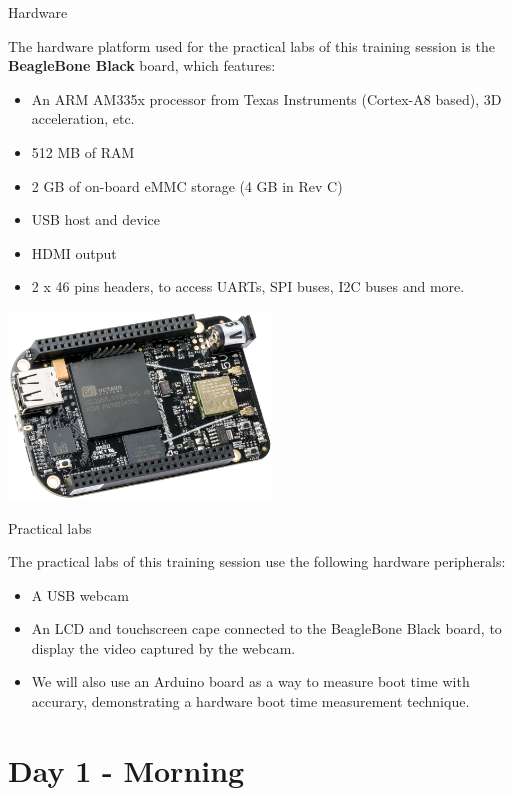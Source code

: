\documentclass[a4paper,12pt,obeyspaces,spaces,hyphens]{article}
\begin{document}
\feshowtitle

\feshowinfo

\feagendatwocolumn
{Hardware}
{
  The hardware platform used for the practical labs of this training
  session is the {\bf BeagleBone Black} board, which features:

  \begin{itemize}
  \item An ARM AM335x processor from Texas Instruments (Cortex-A8
    based), 3D acceleration, etc.
  \item 512 MB of RAM
  \item 2 GB of on-board eMMC storage
        \newline(4 GB in Rev C)
  \item USB host and device
  \item HDMI output
  \item 2 x 46 pins headers, to access UARTs, SPI buses, I2C buses
    and more.
  \end{itemize}
}
{}
{
  \begin{center}
    \includegraphics[height=5cm]{../slides/beagleboneblack-board/beagleboneblack.png}
  \end{center}
}

\feagendaonecolumn
{Practical labs}
{
  The practical labs of this training session use the following
  hardware peripherals:

  \begin{itemize}
  \item A USB webcam
  \item An LCD and touchscreen cape connected to the
    BeagleBone Black board, to display the video captured by the webcam.
  \item We will also use an Arduino board as a way to measure boot time with accurary,
    demonstrating a hardware boot time measurement technique.
  \end{itemize}
}

\section{Day 1 - Morning}
\end{document}
